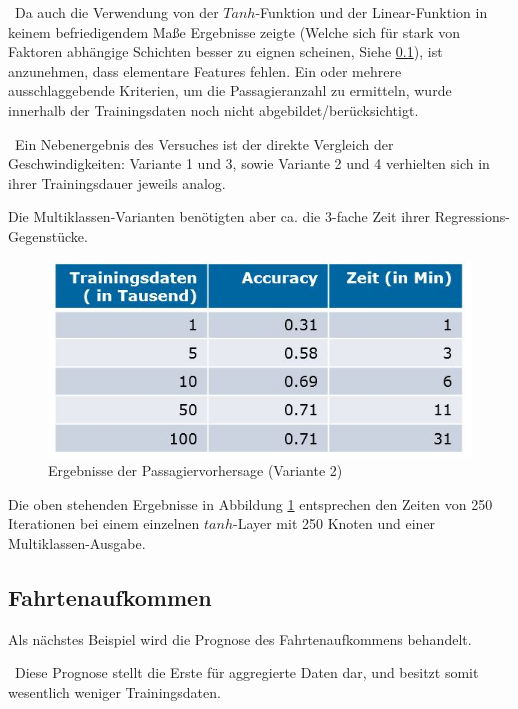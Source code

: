 ~\newline Da auch die Verwendung von der $Tanh$-Funktion und der Linear-Funktion in keinem befriedigendem Maße Ergebnisse zeigte (Welche sich für stark von Faktoren abhängige Schichten besser zu eignen scheinen, Siehe \ref{sec:RidesPred}), ist anzunehmen, dass elementare Features fehlen. Ein oder mehrere ausschlaggebende Kriterien, um die Passagieranzahl zu ermitteln, wurde innerhalb der Trainingsdaten noch nicht abgebildet/berücksichtigt. 

~\newline Ein Nebenergebnis des Versuches ist der direkte Vergleich der Geschwindigkeiten: Variante 1 und 3, sowie Variante 2 und 4 verhielten sich in ihrer Trainingsdauer jeweils analog. 

Die Multiklassen-Varianten benötigten aber ca. die 3-fache Zeit ihrer Regressions-Gegenstücke.

\begin{figure}[h]
	\begin{center}
		\includegraphics[width=0.8\linewidth]{Bilder/PassagierErgebnisse}
		\caption[Ergebnisse der Passagiervorhersage]{Ergebnisse der Passagiervorhersage (Variante 2)}
		\label{fig:PasErg}
	\end{center}
\end{figure}


Die oben stehenden Ergebnisse in Abbildung \ref{fig:PasErg} entsprechen den Zeiten von 250 Iterationen bei einem einzelnen $tanh$-Layer mit 250 Knoten und einer Multiklassen-Ausgabe. 
\newpage
\subsection{Fahrtenaufkommen}
\label{sec:RidesPred}
Als nächstes Beispiel wird die Prognose des Fahrtenaufkommens behandelt. 

~\newline Diese Prognose stellt die Erste für aggregierte Daten dar, und besitzt somit wesentlich weniger Trainingsdaten.

